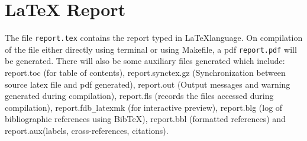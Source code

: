 \documentclass{report}
\begin{document}
\section{LaTeX Report}
The file \texttt{report.tex} contains the report typed in \LaTeX language. On compilation of the file either directly using terminal or using Makefile, a pdf \texttt{report.pdf} will be generated.
There will also be some auxiliary files generated which include: report.toc (for table of contents), report.synctex.gz (Synchronization between source latex file and pdf generated), report.out (Output messages and warning generated during compilation), report.fls (records the files accessed during compilation), report.fdb\texttt{\_}latexmk (for interactive preview), report.blg (log of bibliographic references using BibTeX), report.bbl (formatted references) and report.aux(labels, cross-references, citations).
\end{document}

